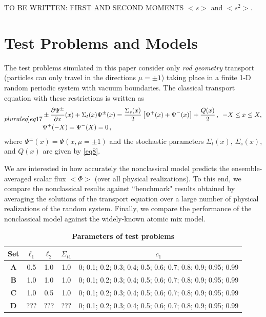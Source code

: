 \documentclass[12pt]{article}
\newcommand{\bl}{\big<}
\newcommand{\bg}{\big>}
\begin{document}
TO BE WRITTEN: FIRST AND SECOND MOMENTS $\bl s \bg$ and $\bl s^2\bg$.

\section{Test Problems and Models}\label{sec4}

The test problems simulated in this paper consider only {\em rod geometry} transport (particles can only travel in the directions $\mu = \pm1$) taking place in a finite 1-D random periodic system with vacuum boundaries.
The classical transport equation with these restrictions is written as
\begin{subequations}\label[pluraleq]{eq17}
\begin{align}
&\pm \frac{\partial \Psi^{\pm}}{\partial x}(x) + \Sigma_t(x)\Psi^{\pm}(x) 
= \frac{\Sigma_s(x)}{2}\left[\Psi^{+}(x)+\Psi^{-}(x)\right]+ \frac{Q(x)}{2}\,,
\,\,\,-X\leq x\leq X,\\
&\Psi^+(-X) = \Psi^-(X) = 0\,,
\end{align}
\end{subequations}
where $\Psi^{\pm}(x) = \Psi(x,\mu=\pm 1)$ and the stochastic parameters $\Sigma_t(x)$, $\Sigma_s(x)$, and $Q(x)$ are given by \cref{eq8}.

We are interested in how accurately the nonclassical model predicts the ensemble-averaged scalar flux $\bl\Phi\bg$ (over all physical realizations).
To this end, we compare the nonclassical results against ``benchmark" results obtained by averaging the solutions of the transport equation over a large number of physical realizations of the random system.
Finally, we compare the performance of the nonclassical model against the widely-known atomic mix model.
\begin{table}[htb]
\centering
\caption{\bf Parameters of test problems}
\label{tab1} 
\begin{tabular}{||c|c|c|c|c||} \hline \hline
\textbf{Set}  & $\ell_1$ & $\ell_2$ & $\Sigma_{t1}$ &$c_1$ \\ \hline\hline
\textbf{A} & 0.5 & 1.0 & 1.0 & 0; 0.1; 0.2; 0.3; 0.4; 0.5; 0.6; 0.7; 0.8; 0.9; 0.95; 0.99\\
\hline
\textbf{B} & 1.0 & 1.0 & 1.0 & 0; 0.1; 0.2; 0.3; 0.4; 0.5; 0.6; 0.7; 0.8; 0.9; 0.95; 0.99\\
\hline
\textbf{C} & 1.0 & 0.5 & 1.0 & 0; 0.1; 0.2; 0.3; 0.4; 0.5; 0.6; 0.7; 0.8; 0.9; 0.95; 0.99\\
\hline
\textbf{D} & ??? & ??? & ??? & 0; 0.1; 0.2; 0.3; 0.4; 0.5; 0.6; 0.7; 0.8; 0.9; 0.95; 0.99\\
 \hline\hline  
  \end{tabular}
\end{table}
\end{document}
